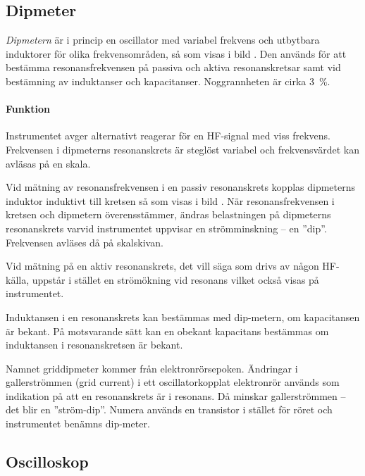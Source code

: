 \subsection{Dipmeter}



\emph{Dipmetern} är i princip en oscillator med variabel frekvens och utbytbara
induktorer för olika frekvensområden, så som visas i bild .
Den används för att bestämma resonansfrekvensen på passiva och aktiva
resonanskretsar samt vid bestämning av induktanser och kapacitanser.
Noggrannheten är cirka 3~\%.

\paragraph{Funktion}
Instrumentet avger alternativt reagerar för en HF-signal med viss frekvens.
Frekvensen i dipmeterns resonanskrets är steglöst variabel och frekvensvärdet
kan avläsas på en skala.

Vid mätning av resonansfrekvensen i en passiv resonanskrets kopplas dipmeterns
induktor induktivt till kretsen så som visas i bild .
När resonansfrekvensen i kretsen och dipmetern överensstämmer, ändras 
belastningen på dipmeterns resonanskrets varvid instrumentet uppvisar en
strömminskning -- en ''dip''.
Frekvensen avläses då på skalskivan.

Vid mätning på en aktiv resonanskrets, det vill säga som drivs av någon
HF-källa, uppstår i stället en strömökning vid resonans vilket också visas på
instrumentet.

Induktansen i en resonanskrets kan bestämmas med dip-metern, om kapacitansen
är bekant.
På motsvarande sätt kan en obekant kapacitans bestämmas om induktansen i
resonanskretsen är bekant.

Namnet griddipmeter kommer från elektronrörsepoken.
Ändringar i gallerströmmen (grid current) i ett oscillatorkopplat elektronrör
används som indikation på att en resonanskrets är i resonans.
Då minskar gallerströmmen -- det blir en ''ström-dip''.
Numera används en transistor i stället för röret och instrumentet benämns
dip-meter.

\subsection{Oscilloskop}

